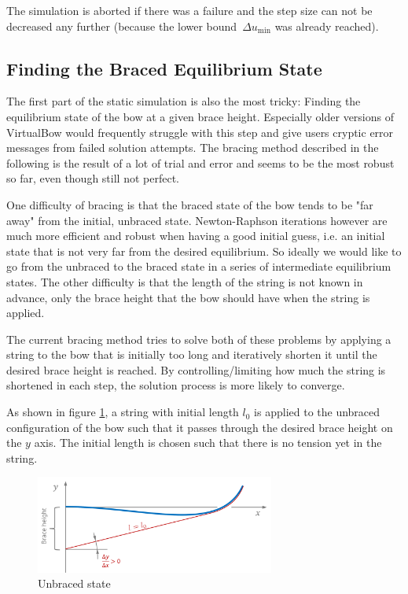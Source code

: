 The simulation is aborted if there was a failure and the step size can not be decreased any further (because the lower bound~$\Delta u_\mathrm{min}$ was already reached).

\newpage
\subsection{Finding the Braced Equilibrium State}

The first part of the static simulation is also the most tricky: Finding the equilibrium state of the bow at a given brace height.
Especially older versions of VirtualBow would frequently struggle with this step and give users cryptic error messages from failed solution attempts.
The bracing method described in the following is the result of a lot of trial and error and seems to be the most robust so far, even though still not perfect.

One difficulty of bracing is that the braced state of the bow tends to be "far away" from the initial, unbraced state.
Newton-Raphson iterations however are much more efficient and robust when having a good initial guess, i.e. an initial state that is not very far from the desired equilibrium.
So ideally we would like to go from the unbraced to the braced state in a series of intermediate equilibrium states.
The other difficulty is that the length of the string is not known in advance, only the brace height that the bow should have when the string is applied.

The current bracing method tries to solve both of these problems by applying a string to the bow that is initially too long and iteratively shorten it until the desired brace height is reached.
By controlling/limiting how much the string is shortened in each step, the solution process is more likely to converge.

As shown in figure \ref{fig:bracing-method-1}, a string with initial length $l_{0}$ is applied to the unbraced configuration of the bow such that it passes through the desired brace height on the $y$ axis.
The initial length is chosen such that there is no tension yet in the string.

\begin{figure}[h]
\centering
\includegraphics[width=0.7\textwidth]{figures/solution/bracing-method-1}
\caption{Unbraced state}
\label{fig:bracing-method-1}
\end{figure}

